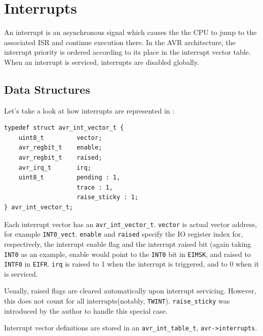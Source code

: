 \section{Interrupts}

An interrupt is an asynchronous signal which causes the the \ac{CPU} to jump to
the associated \ac{ISR} and continue execution there. In the \ac{AVR} architecture,
the interrupt priority is ordered according to its place in the interrupt
vector table. When an interrupt is serviced, interrupts are disabled globally.

\subsection{Data Structures}

Let's take a look at how interrupts are represented in \simavr:

\begin{lstlisting}
typedef struct avr_int_vector_t {
    uint8_t         vector;
    avr_regbit_t    enable;
    avr_regbit_t    raised;
    avr_irq_t       irq;
    uint8_t         pending : 1,
                    trace : 1,
                    raise_sticky : 1;
} avr_int_vector_t;
\end{lstlisting}

Each interrupt vector has an \lstinline|avr_int_vector_t|. \lstinline|vector| is
actual vector address, for example \lstinline|INT0_vect|. \lstinline|enable|
and \lstinline|raised| specify the \ac{IO} register index for, respectively, the
interrupt enable flag and the interrupt raised bit (again taking \lstinline|INT0|
as an example, enable would point to the \lstinline|INT0| bit in \lstinline|EIMSK|,
and raised to \lstinline|INTF0| in \lstinline|EIFR|. \lstinline|irq| is raised to
1 when the interrupt is triggered, and to 0 when it is serviced.

Usually, raised flags are cleared automatically upon interrupt servicing. However,
this does not count for all interrupts(notably, \lstinline|TWINT|).
\lstinline|raise_sticky| was introduced by the author to handle this special case.

Interrupt vector definitions are stored in an \lstinline|avr_int_table_t|,
\lstinline|avr->interrupts|.

